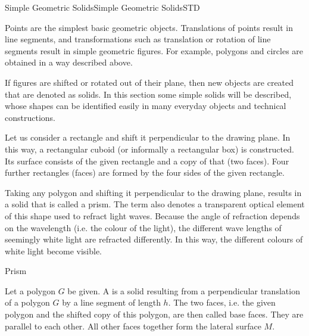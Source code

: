 \begin{MXContent}{Simple Geometric Solids}{Simple Geometric Solids}{STD}%

Points are the simplest basic geometric objects. Translations of points result in
line segments, and transformations such as translation or rotation of 
line segments result in simple geometric figures. For example, polygons and circles 
are obtained in a way described above. 

If figures are shifted or rotated out of their plane, then new objects are 
created that are denoted as solids. In this section some simple solids 
will be described, whose shapes can be identified easily in many everyday objects 
and technical constructions.

\begin{MExample}
Let us consider a rectangle and shift it perpendicular to the drawing plane.
In this way, a rectangular cuboid (or informally a rectangular box) is constructed. 
Its surface consists of the given rectangle and a copy of that (two faces). Four further rectangles (faces) are formed by the four sides of the given rectangle.
\end{MExample}

Taking any polygon and shifting it perpendicular to the drawing plane, results in a solid 
that is called a prism. The term also denotes a transparent optical element 
of this shape used to refract light waves. Because the angle of refraction
depends on the wavelength (i.e. the colour of the light), the different wave lengths of seemingly white 
light are refracted differently. In this way, the different colours of white light become visible.

\begin{MXInfo}{Prism}

Let a polygon $G$ be given. A  is a solid resulting from 
a perpendicular translation of a polygon $G$ by a line segment of length $h$.
The two faces, i.e. the given polygon and the shifted copy of this polygon,
are then called base faces. They are parallel to each other. All other 
faces together form the lateral surface $M$.


\end{MXInfo}
\end{MXContent}
